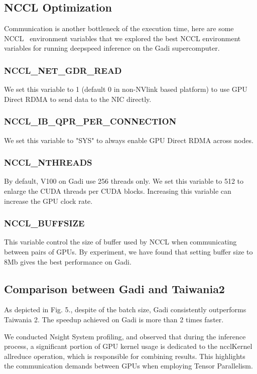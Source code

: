 \subsection{NCCL Optimization}
Communication is another bottleneck of the execution time, here are some NCCL~\cite{jeaugey2017nccl} environment variables that we explored the best NCCL environment variables for running deepspeed inference on the Gadi supercomputer.
\subsubsection{NCCL\_NET\_GDR\_READ}
We set this variable to 1 (default 0 in non-NVlink based platform) to use GPU Direct RDMA to send data to the NIC directly.
\subsubsection{NCCL\_IB\_QPR\_PER\_CONNECTION}
We set this variable to "SYS" to always enable GPU Direct RDMA across nodes.
\subsubsection{NCCL\_NTHREADS}
By default, V100 on Gadi use 256 threads only. We set this variable to 512 to enlarge the CUDA threads per CUDA blocks. Increasing this variable can increase the GPU clock rate.
\subsubsection{NCCL\_BUFFSIZE}
This variable control the size of buffer used by NCCL when communicating between pairs of GPUs. By experiment, we have found that setting buffer size to 8Mb gives the best performance on Gadi.



\subsection{Comparison between Gadi and Taiwania2}
As depicted in Fig. 5., despite of the batch size, Gadi consistently outperforms Taiwania 2. The speedup achieved on Gadi is more than 2 times faster.

We conducted Nsight System profiling, and observed that during the inference process, a significant portion of GPU kernel usage is dedicated to the ncclKernel allreduce operation, which is responsible for combining results. This highlights the communication demands between GPUs when employing Tensor Parallelism.


